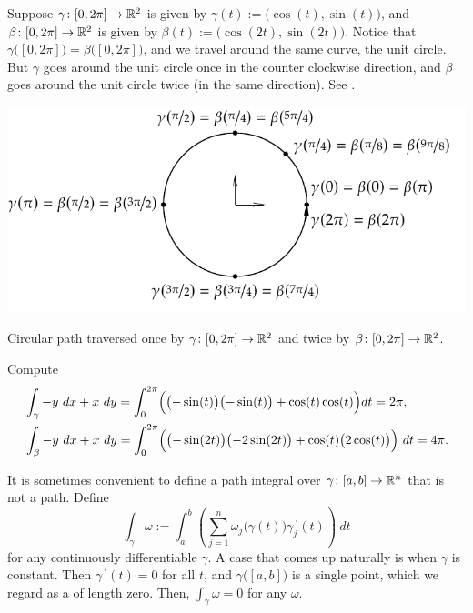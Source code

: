 \begin{example}
Suppose $\gamma \colon [0,2\pi] \to {\mathbb{R}}^2$ is given by $\gamma(t) :=
\bigl(\cos(t),\sin(t)\bigr)$, and
$\beta \colon [0,2\pi] \to {\mathbb{R}}^2$ is given by $\beta(t) :=
\bigl(\cos(2t),\sin(2t)\bigr)$.  Notice that
$\gamma\bigl([0,2\pi]\bigr) = \beta\bigl([0,2\pi]\bigr)$, and we travel
around the same curve, the unit circle.  But $\gamma$ goes around the unit
circle once in the counter clockwise direction, and $\beta$ goes around the
unit circle twice (in the same direction). 
See .
\begin{myfigureht}
\includegraphics{figures/circlepathrepar2}
\caption{Circular path traversed once by
$\gamma \colon [0,2\pi] \to {\mathbb{R}}^2$
and twice by
$\beta \colon [0,2\pi] \to {\mathbb{R}}^2$.\label{fig:circlepathrepar2}}
\end{myfigureht}

Compute
\begin{align*}
& \int_{\gamma} -y~ dx + x~dy
=
\int_0^{2\pi}
\Bigl( \bigl(-\sin(t) \bigr) \bigl(-\sin(t) \bigr) + \cos(t) \cos(t) \Bigr) dt
=
2 \pi,\\
& \int_{\beta} -y~ dx + x~dy
=
\int_0^{2\pi}
\Bigl( \bigl(-\sin(2t) \bigr) \bigl(-2\sin(2t) \bigr) + \cos(t)
\bigl(2\cos(t)\bigr) \Bigr) ~dt
=
4 \pi.
\end{align*}
\end{example}

It is sometimes convenient to define a path integral over $\gamma \colon
[a,b] \to {\mathbb{R}}^n$ that is not a path.
Define
\begin{equation*}
\int_{\gamma} \omega := \int_a^b
\left(
\sum_{j=1}^n
\omega_j\bigl(\gamma(t)\bigr) \gamma_j^{\:\prime}(t)
\right) ~ dt 
\end{equation*}
for any continuously differentiable $\gamma$.  A 
case that comes up naturally is when $\gamma$ is constant.  Then
$\gamma^{\:\prime}(t) = 0$ for all $t$, and $\gamma\bigl([a,b]\bigr)$ is a single
point, which we regard as a  of length zero.  Then,
$\int_{\gamma} \omega = 0$ for any $\omega$.

